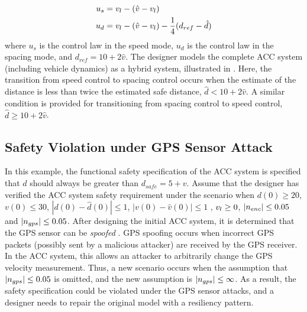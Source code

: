 \begin{align}
u_s & = v_{l} - (\hat{v}-v_{l}) \nonumber \\
u_d & = v_{l} - (\hat{v}-v_{l}) - \frac{1}{4} (d_{ref} - \hat{d}) 
\end{align}
%
%
where $u_s$ is the control law in the speed mode, $u_d$ is the control law in the spacing mode, and $d_{ref} = 10 + 2\hat{v}$. %
%
The designer models the complete ACC system (including vehicle dynamics) as a hybrid system, illustrated in . Here, the transition from speed control to spacing control occurs when the estimate of the distance is less than twice the estimated safe distance, \ie $\hat{d} < 10 + 2\hat{v}$. A similar condition is provided for transitioning from spacing control to speed control, \ie $\hat{d} \geq 10 + 2\hat{v}$. 
%
%
%

\subsection{Safety Violation under GPS Sensor Attack}
%
In this example, the functional safety specification of the ACC system is specified that $d$ should always be greater than $d_{safe} = 5 + v$. Assume that the designer has verified the ACC system safety requirement under the scenario when $d(0) \geq 20$, $v(0) \leq 30$, $|d(0) - \hat{d}(0)| \leq 1$, $|v(0) - \hat{v}(0)| \leq 1$ , $v_{l} \geq 0$, $|n_{enc}| \leq 0.05$ and $|n_{gps}| \leq 0.05$.
%
After designing the initial ACC system, it is determined that the GPS sensor can be \emph{spoofed} \cite{tippenhauer2011requirements, kerns2014unmanned}. GPS spoofing occurs when incorrect GPS packets (possibly sent by a malicious attacker) are received by the GPS receiver. In the ACC system, this allows an attacker to arbitrarily change the GPS velocity measurement. 
%
Thus, a new scenario occurs when the assumption that $|n_{gps}| \leq 0.05$ is omitted, and the new assumption is $|n_{gps}| \leq \infty$.
As a result, the safety specification could be violated under the GPS sensor attacks, and a designer needs to repair the original model with a resiliency pattern. 

